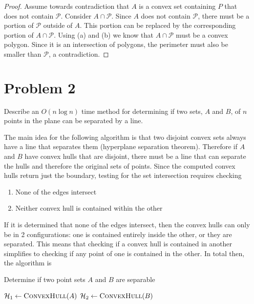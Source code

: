 \documentclass{eeleyes}
\begin{document}
\begin{proof}
    Assume towards contradiction that $A$ is a convex set containing $P$ that does not contain $\mathcal{P}$. Consider $A \cap \mathcal{P}$. Since $A$ does not contain $\mathcal{P}$, there must be a portion of $\mathcal{P}$ outside of $A$. This portion can be replaced by the corresponding portion of $A \cap \mathcal{P}$. Using (a) and (b) we know that $A \cap \mathcal{P}$ must be a convex polygon. Since it is an intersection of polygons, the perimeter must also be smaller than $\mathcal{P}$, a contradiction.
\end{proof}

\section*{Problem 2}

\begin{problem}
    Describe an $O(n \log n)$ time method for determining if two sets, $A$ and $B$, of $n$ points in the plane can be separated by a line.
\end{problem}
The main idea for the following algorithm is that two disjoint convex sets always have a line that separates them (hyperplane separation theorem). Therefore if $A$ and $B$ have convex hulls that are disjoint, there must be a line that can separate the hulls and therefore the original sets of points. Since the computed convex hulls return just the boundary, testing for the set intersection requires checking
\begin{enumerate}
    \item None of the edges intersect
    \item Neither convex hull is contained within the other
\end{enumerate}

If it is determined that none of the edges intersect, then the convex hulls can only be in 2 configurations: one is contained entirely inside the other, or they are separated. 
\marginpar{$(\star)$}
This means that checking if a convex hull is contained in another simplifies to checking if any point of one is contained in the other. In total then, the algorithm is 

\begin{algorithm}[H]
\caption{Determine if two point sets $A$ and $B$ are separable}
\begin{algorithmic}[1]
        \State $\mathcal{H}_1 \gets \Call{ConvexHull}{A}$
        \State $\mathcal{H}_2 \gets \Call{ConvexHull}{B}$

            \State {}
            \State {}
            \State {}
        \Else
            \State {}
        \EndIf
    \EndProcedure
\end{algorithmic}
\end{algorithm}
\end{document}

